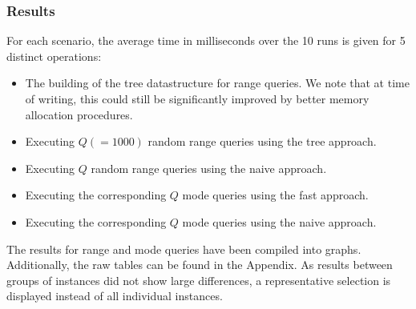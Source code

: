 \documentclass{article}
\newcommand{\fbnote}[1]{{}}
\begin{document}
\subsubsection*{Results}
For each scenario, the average time in milliseconds over the 10 runs is given for 5 distinct operations:
\begin{itemize}
    \item The building of the tree datastructure for range queries. We note that at time
          of writing, this could still be significantly improved by better memory
          allocation procedures.
    \item Executing $Q (= 1000)$ random range queries using the tree approach.
    \item Executing $Q$ random range queries using the naive approach.
    \item Executing the corresponding $Q$ mode queries using the fast approach.
    \item Executing the corresponding $Q$ mode queries using the naive approach.
\end{itemize}
\fbnote{Reaction to Franks question on performance effect by doing range-mode in sets of 1 instead of batching them: I didn't get around to testing this, but I'm guessing that the way we're doing it now would be slightly faster as more of the range(/mode) datastructure can remain cached.}
The results for range and mode queries have been compiled into graphs. Additionally, the raw tables can be found in the Appendix. As results between groups of instances did not show large differences, a representative selection is displayed instead of all individual instances. \fbnote{Cleaned up legends of graphs a bit by aligning scenario names properly, adjusted colors, added figure numbers} \\


\end{document}
